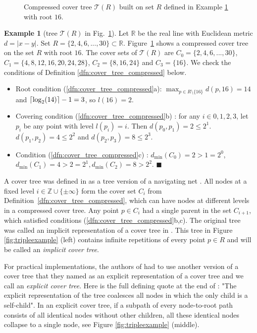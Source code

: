 \documentclass[a4paper,UKenglish,cleveref, autoref]{lipics-v2019}
\numberwithin{algocf}{section}
\theoremstyle{definition}
\theoremstyle{definition}
\newtheorem{exa}[algocf]{Example}
\theoremstyle{definition}
\theoremstyle{plain}
\DeclarePairedDelimiter\ceil{\lceil}{\rceil}
\newcommand{\R}{\mathbb{R}}
\newcommand{\Z}{\mathbb{Z}}
\newcommand{\T}{\mathcal{T}}
\newcommand{\bs}{\hfill $\blacksquare$}
\begin{document}
\begin{figure}[h]
\centering

\caption{Compressed cover tree $\T(R)$ built on set $R$ defined in Example \ref{exa:cover_tree_big} with root $16$. }
\label{fig:cover_tree_big}
\end{figure}

\begin{exa}[tree $\T(R)$ in Fig.~\ref{fig:cover_tree_big}]
\label{exa:cover_tree_big}
Let $\R$ be the real line with Euclidean metric $d = |x-y|$.
Set $R = \{2,4,6,...,30\}\subset\R$. 
Figure~\ref{fig:cover_tree_big} shows a compressed cover tree on the set $R$ with root $16$. 
The cover sets of $\T(R)$ are $ C_{0} = \{2,4,6,...,30\}$, $C_1 = \{4,8,12,16,20,24,28\}$, $C_{2} = \{8,16,24\}$ and $C_{3} = \{16\}$.
We check the conditions of Definition \ref{dfn:cover_tree_compressed} below.
 \begin{itemize}
\item Root condition (\ref{dfn:cover_tree_compressed}a): $\max_{p \in R \setminus \{16\}}d(p, 16) = 14$ and $\ceil{\log_2(14)} - 1= 3$, so $l(16) = 2$.
    \item Covering condition (\ref{dfn:cover_tree_compressed}b) : for any $i \in {0,1,2,3}$, let $p_i$ be any point with level $l(p_i) = i$. Then  $d(p_{0}, p_{1}) = 2 \leq 2^{1}$. $d(p_1, p_2) = 4 \leq 2^{2}$ and  $d(p_2, p_3) = 8 \leq 2^{3}$.
     \item  Condition (\ref{dfn:cover_tree_compressed}c) : $d_{\min}(C_{0}) = 2 > 1 = 2^{0}$, $d_{\min}(C_{1}) = 4 > 2 = 2^{1}, d_{\min}(C_{2}) = 8 > 2^{2}$. 
 \bs
 \end{itemize}
\end{exa}

A cover tree was defined in \cite[Section~2]{beygelzimer2006cover} as a tree version of a navigating net \cite[Section ~ 2.1]{krauthgamer2004navigating}. 
All nodes at a fixed level $i \in \Z\cup \{\pm\infty\}$ form the cover set $C_i$ from Definition~\ref{dfn:cover_tree_compressed}, which can have nodes at different levels in a compressed cover tree. 
Any point $p \in C_i$ had a single parent in the set $C_{i+1}$, which satisfied conditions (\ref{dfn:cover_tree_compressed}b,c). 
The original tree was called an implicit representation of a cover tree in
\cite[Section ~ 2]{beygelzimer2006cover}.
This tree in Figure \ref{fig:tripleexample} (left) contains infinite repetitions of every point $p\in R$ and will be called an \emph{implicit cover tree}.
\medskip

For practical implementations, the authors of \cite{beygelzimer2006cover} had to use another version of a cover tree that they named as an explicit representation of a cover tree and we call an \emph{explicit cover tree}. 
Here is the full defining quote at the end of \cite[Section~2]{beygelzimer2006cover}: "The explicit representation of the tree coalesces all nodes in which the only child is a self-child". 
In an explicit cover tree, if a subpath of every node-to-root path consists of all identical nodes without other children, all these identical nodes collapse to a single node, see Figure \ref{fig:tripleexample} (middle). 
\medskip
\end{document}
